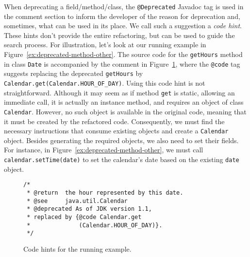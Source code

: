 \documentclass[conference]{IEEEtran}
\begin{document}
When deprecating a field/method/class, the
\lstinline[breaklines=true]{@Deprecated} Javadoc tag is used in the comment
section to inform the developer of the reason for deprecation and,
sometimes, what can be used in its place.  We call such a suggestion a {\em
code hint}.  These hints don't provide the entire refactoring, but can be
used to guide the search process.
%
For illustration, let's look at our running example in
Figure~\ref{ex:deprecated-method-other}.  The source code for the
\lstinline[breaklines=true]{getHours} method in class \lstinline[breaklines=true]{Date} is accompanied by the
comment in Figure~\ref{ex:code-hints}, where the \lstinline[breaklines=true]{@code} tag suggests
replacing the deprecated \lstinline[breaklines=true]{getHours} by
\lstinline[breaklines=true]{Calendar.get(Calendar.HOUR_OF_DAY)}.
%
Using this code hint is not straightforward.
Although it may seem as if
method \lstinline[breaklines=true]{get} is static, allowing an immediate call,
it is actually an instance method, and requires an object of
class \lstinline[breaklines=true]{Calendar}. However, no such object is available in the
original code, meaning that it must be created by the refactored code.
Consequently, we must find the necessary
instructions that consume existing objects and create a \lstinline[breaklines=true]{Calendar} object.
Besides generating the required objects, we also need to set their
fields. For instance,
in Figure~\ref{ex:deprecated-method-other}, we must call
\lstinline[breaklines=true]{calendar.setTime(date)} to set the calendar's date
based on the existing \lstinline[breaklines=true]{date} object.


\begin{figure}
\begin{lstlisting}[mathescape=true,showstringspaces=false]
/*
 * @return  the hour represented by this date.
 * @see     java.util.Calendar
 * @deprecated As of JDK version 1.1,
 * replaced by {@code Calendar.get
 *              (Calendar.HOUR_OF_DAY)}.
 */  
\end{lstlisting}
\caption{Code hints for the running example.}
\label{ex:code-hints}
\end{figure}



\end{document}
